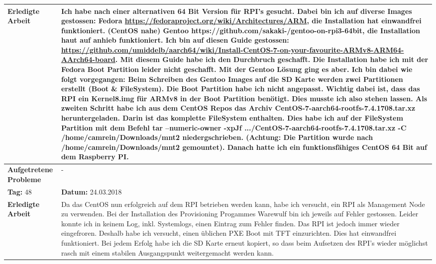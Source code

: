 \begin{longtable}{|p{5cm}|p{5cm}p{6cm}|}
\textbf{Erledigte Arbeit} & \multicolumn{2}{p{11cm}|}{Ich habe nach einer alternativen 64 Bit Version für RPI's gesucht. Dabei bin ich auf diverse Images gestossen: \newline Fedora \url{https://fedoraproject.org/wiki/Architectures/ARM}, die Installation hat einwandfrei funktioniert. (CentOS nahe) \newline Gentoo https://github.com/sakaki-/gentoo-on-rpi3-64bit, die Installation haut auf anhieb funktioniert. Ich bin auf diesen Guide gestossen: \url{https://github.com/umiddelb/aarch64/wiki/Install-CentOS-7-on-your-favourite-ARMv8-ARM64-AArch64-board}. Mit diesem Guide habe ich den Durchbruch geschafft. Die Installation habe ich mit der Fedora Boot Partition leider nicht geschafft. Mit der Gentoo Lösung ging es aber. Ich bin dabei wie folgt vorgegangen: Beim Schreiben des Gentoo Images auf die SD Karte werden zwei Partitionen erstellt (Boot \& FileSystem). Die Boot Partition habe ich nicht angepasst. Wichtig dabei ist, dass das RPI ein Kernel8.img für ARMv8 in der Boot Partition benötigt. Dies musste ich also stehen lassen. Als zweiten Schritt habe ich aus dem CentOS Repos das Archiv CentOS-7-aarch64-rootfs-7.4.1708.tar.xz heruntergeladen. Darin ist das komplette FileSystem enthalten. Dies habe ich auf der FileSystem Partition mit dem Befehl tar --numeric-owner -xpJf .../CentOS-7-aarch64-rootfs-7.4.1708.tar.xz -C /home/camrein/Downloads/mnt2 niedergschrieben. (Achtung: Die Partition wurde nach /home/camrein/Downloads/mnt2 gemountet). Danach hatte ich ein funktionsfähiges CentOS 64 Bit auf dem Raspberry PI.} \\ \hline
\textbf{Aufgetretene Probleme} & \multicolumn{2}{p{11cm}|}{-} \\ \hline
\rowcolor{heading}\textbf{Tag:} 48 & \textbf{Datum:} 24.03.2018 & \\ \hline
\textbf{Erledigte Arbeit} & \multicolumn{2}{p{11cm}|}{Da das CentOS nun erfolgreich auf dem RPI betrieben werden kann, habe ich versucht, ein RPI als Management Node zu verwenden. Bei der Installation des Provisioning Progammes Warewulf bin ich jeweils auf Fehler gestossen. Leider konnte ich in keinem Log, inkl. Systemlogs, einen Eintrag zum Fehler finden. Das RPI ist jedoch immer wieder eingefroren. Deshalb habe ich versucht, einen üblichen PXE Boot mit TFT einzurichten. Dies hat einwandfrei funktioniert. Bei jedem Erfolg habe ich die SD Karte erneut kopiert, so dass beim Aufsetzen des RPI's wieder möglichst rasch mit einem stabilen Ausgangspunkt weitergemacht werden kann.} \\ \hline

\end{longtable}

